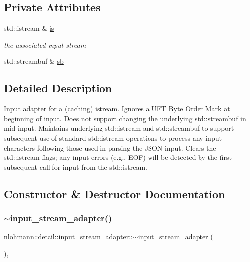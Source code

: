 \subsection*{Private Attributes}
\begin{DoxyCompactItemize}
\item 
std\+::istream \& \mbox{\hyperlink{classnlohmann_1_1detail_1_1input__stream__adapter_ac3afada8eaf7d6cd2b475a3388d5e992}{is}}
\begin{DoxyCompactList}\small\item\em the associated input stream \end{DoxyCompactList}\item 
std\+::streambuf \& \mbox{\hyperlink{classnlohmann_1_1detail_1_1input__stream__adapter_addd96de4b5cbd9925ed5d8a0f0261143}{sb}}
\end{DoxyCompactItemize}


\subsection{Detailed Description}
Input adapter for a (caching) istream. Ignores a U\+FT Byte Order Mark at beginning of input. Does not support changing the underlying std\+::streambuf in mid-\/input. Maintains underlying std\+::istream and std\+::streambuf to support subsequent use of standard std\+::istream operations to process any input characters following those used in parsing the J\+S\+ON input. Clears the std\+::istream flags; any input errors (e.\+g., E\+OF) will be detected by the first subsequent call for input from the std\+::istream. 

\subsection{Constructor \& Destructor Documentation}
\mbox{\label{classnlohmann_1_1detail_1_1input__stream__adapter_a2d71eb469267abd864f765481d1e823f}} 
\subsubsection{\texorpdfstring{$\sim$input\_stream\_adapter()}{~input\_stream\_adapter()}}
{\footnotesize\ttfamily nlohmann\+::detail\+::input\+\_\+stream\+\_\+adapter\+::$\sim$input\+\_\+stream\+\_\+adapter (\begin{DoxyParamCaption}{ }\end{DoxyParamCaption})\hspace{0.3cm}{\ttfamily [inline]}, {\ttfamily [override]}}

